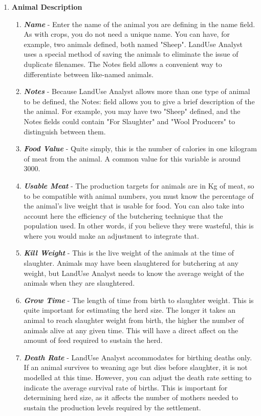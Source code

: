   \begin{enumerate}
    \item \textbf{Animal Description}
      \begin{enumerate}
        \item \textit{\textbf{Name}} - Enter the name of the animal you are
defining in the name field.  As with crops, you do not need a unique name. You
can have, for example, two animals defined, both named "Sheep". LandUse Analyst
uses a special method of saving the animals to eliminate the issue of duplicate
filenames.  The Notes field allows a convenient way to differentiate between
like-named animals.
        \item  \textit{\textbf{Notes}} - Because LandUse Analyst allows more
than one type of animal to be defined, the Notes: field allows you to give a
brief description of the the animal. For example, you may have two "Sheep"
defined, and the Notes fields could contain "For Slaughter" and "Wool Producers"
to distinguish between them.
        \item  \textit\textbf{{Food Value}} - Quite simply, this is the number
of calories in one kilogram of meat from the animal.  A common value for this
variable is around 3000.
        \item  \textit{\textbf{Usable Meat}} - The production targets for
animals are in Kg of meat, so to be compatible with animal numbers, you must
know the percentage of the animal's live weight that is usable for food. You can
also take into account here the efficiency of the butchering technique that the
population used. In other words, if you believe they were wasteful, this is
where you would make an adjustment to integrate that.
        \item  \textit{\textbf{Kill Weight}} - This is the live weight of the
animals at the time of slaughter.  Animals may have been slaughtered for
butchering at any weight, but LandUse Analyst needs to know the average weight
of the animals when they are slaughtered.
        \item  \textit{\textbf{Grow Time}} - The length of time from birth to
slaughter weight.  This is quite important for estimating the herd size. The
longer it takes an animal to reach slaughter weight from birth, the higher the
number of animals alive at any given time.  This will have a direct affect on
the amount of feed required to sustain the herd.
        \item  \textit{\textbf{Death Rate}} - LandUse Analyst accommodates for
birthing deaths only. If an animal survives to weaning age but dies before
slaughter, it is not modelled at this time. However, you can adjust the death
rate setting to indicate the average survival rate of births. This is important
for determining herd size, as it affects the number of mothers needed to sustain
the production levels required by the settlement. 
      \end{enumerate}


\end{enumerate}
